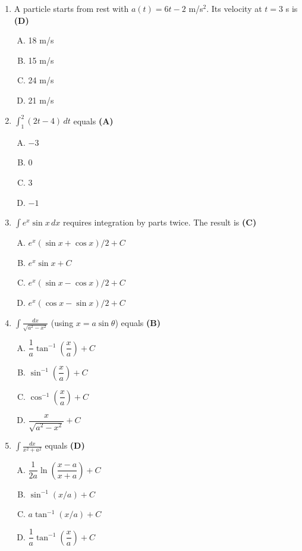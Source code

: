 \documentclass[10pt,a4paper]{article}
\begin{document}
\begin{enumerate}[1.]
\item A particle starts from rest with $a(t) = 6t - 2$ m/s$^2$. Its velocity at $t = 3$ s is \hfill \textbf{(D)}
\begin{enumerate}[(A)]
    \item 18 m/s
    \item 15 m/s
    \item 24 m/s
    \item 21 m/s
\end{enumerate}

\item $\displaystyle\int_1^2 (2t-4)\,dt$ equals \hfill \textbf{(A)}
\begin{enumerate}[(A)]
    \item $-3$
    \item $0$
    \item $3$
    \item $-1$
\end{enumerate}

\item $\displaystyle\int e^x \sin x\,dx$ requires integration by parts twice. The result is \hfill \textbf{(C)}
\begin{enumerate}[(A)]
    \item $e^x(\sin x + \cos x)/2 + C$
    \item $e^x\sin x + C$
    \item $e^x(\sin x - \cos x)/2 + C$
    \item $e^x(\cos x - \sin x)/2 + C$
\end{enumerate}

\item $\displaystyle\int \frac{dx}{\sqrt{a^2 - x^2}}$ (using $x = a\sin\theta$) equals \hfill \textbf{(B)}
\begin{enumerate}[(A)]
    \item $\dfrac{1}{a}\tan^{-1}\!\left(\dfrac{x}{a}\right) + C$
    \item $\sin^{-1}\!\left(\dfrac{x}{a}\right) + C$
    \item $\cos^{-1}\!\left(\dfrac{x}{a}\right) + C$
    \item $\dfrac{x}{\sqrt{a^2-x^2}} + C$
\end{enumerate}

\item $\displaystyle\int \frac{dx}{x^2 + a^2}$ equals \hfill \textbf{(D)}
\begin{enumerate}[(A)]
    \item $\dfrac{1}{2a}\ln\!\left(\dfrac{x-a}{x+a}\right) + C$
    \item $\sin^{-1}(x/a) + C$
    \item $a\tan^{-1}(x/a) + C$
    \item $\dfrac{1}{a}\tan^{-1}\!\left(\dfrac{x}{a}\right) + C$
\end{enumerate}


\end{enumerate}
\end{document}
